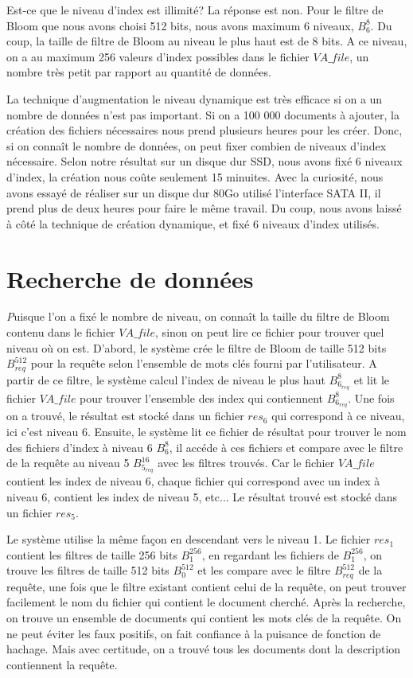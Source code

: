 	Est-ce que le niveau d'index est illimité? La réponse est non. Pour le filtre de Bloom que nous avons choisi 512 bits, nous avons maximum 6 niveaux, $B^{8}_6$. Du coup, la taille de filtre de Bloom au niveau le plus haut est de 8 bits. A ce niveau, on a au maximum 256 valeurs d'index possibles dans le fichier $VA\_file$, un nombre très petit par rapport au quantité de données. 
	
	La technique d'augmentation le niveau dynamique est très efficace si on a un nombre de données n'est pas important. Si on a 100 000 documents à ajouter, la création des fichiers nécessaires nous prend plusieurs heures pour les créer. Donc, si on connaît le nombre de données, on peut fixer combien de niveaux d'index nécessaire. Selon notre résultat sur un disque dur SSD, nous avons fixé 6 niveaux d'index, la création nous coûte seulement 15 minuites. Avec la curiosité, nous avons essayé de réaliser sur un disque dur 80Go utilisé l'interface SATA II, il prend plus de deux heures pour faire le même travail. Du coup, nous avons laissé à côté la technique de création dynamique, et fixé 6 niveaux d'index utilisés.	
	
\section{Recherche de données}
	{\huge \itshape P}uisque l'on a fixé le nombre de niveau, on connaît la taille du filtre de Bloom contenu dans le fichier $VA\_file$, sinon on peut lire ce fichier pour trouver quel niveau où on est. D'abord, le système crée le filtre de Bloom de taille 512 bits $B^{512}_{req}$ pour la requête selon l'ensemble de mots clés fourni par l'utilisateur. A partir de ce filtre, le système calcul l'index de niveau le plus haut $B^{8}_{6_{req}}$ et lit le fichier $VA\_file$ pour trouver l'ensemble des index qui contiennent $B^{8}_{6_{req}}$. Une fois on a trouvé, le résultat est stocké dans un fichier $res_6$ qui correspond à ce niveau, ici c'est niveau 6. Ensuite, le système lit ce fichier de résultat pour trouver le nom des fichiers d'index à niveau 6 $B^{8}_{6}$, il accéde à ces fichiers et compare avec le filtre de la requête au niveau 5 $B^{16}_{5_{req}}$ avec les filtres trouvés. Car le fichier $VA\_file$ contient les index de niveau 6, chaque fichier qui correspond avec un index à niveau 6, contient les index de niveau 5, etc... Le résultat trouvé est stocké dans un fichier $res_5$. 
	
	Le système utilise la même façon en descendant vers le niveau 1. Le fichier $res_1$ contient les filtres de taille 256 bits $B^{256}_{1}$, en regardant les fichiers de $B^{256}_{1}$, on trouve les filtres de taille 512 bits $B^{512}_{0}$ et les compare avec le filtre $B^{512}_{req}$ de la requête, une fois que le filtre existant contient celui de la requête, on peut trouver facilement le nom du fichier qui contient le document cherché. Après la recherche, on trouve un ensemble de documents qui contient les mots clés de la requête. On ne peut éviter les faux positifs, on fait confiance à la puisance de fonction de hachage. Mais avec certitude, on a trouvé tous les documents dont la description contiennent la requête.

